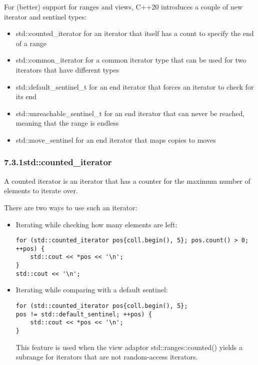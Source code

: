 
For (better) support for ranges and views, C++20 introduces a couple of new iterator and sentinel types:

\begin{itemize}
\item
std::counted\_iterator for an iterator that itself has a count to specify the end of a range

\item
std::common\_iterator for a common iterator type that can be used for two iterators that have different types

\item
std::default\_sentinel\_t for an end iterator that forces an iterator to check for its end

\item
std::unreachable\_sentinel\_t for an end iterator that can never be reached, meaning that the range is endless

\item
std::move\_sentinel for an end iterator that maps copies to moves
\end{itemize}

\subsubsection*{ 7.3.1\hspace{0.2cm}std::counted\_iterator}

A counted iterator is an iterator that has a counter for the maximum number of elements to iterate over.

There are two ways to use such an iterator:

\begin{itemize}
\item
Iterating while checking how many elements are left:

\begin{lstlisting}[style=styleCXX]
for (std::counted_iterator pos{coll.begin(), 5}; pos.count() > 0; ++pos) {
	std::cout << *pos << '\n';
}
std::cout << '\n';
\end{lstlisting}

\item
Iterating while comparing with a default sentinel:

\begin{lstlisting}[style=styleCXX]
for (std::counted_iterator pos{coll.begin(), 5};
pos != std::default_sentinel; ++pos) {
	std::cout << *pos << '\n';
}
\end{lstlisting}

This feature is used when the view adaptor std::ranges::counted() yields a subrange for iterators that are not random-access iterators.
\end{itemize}


